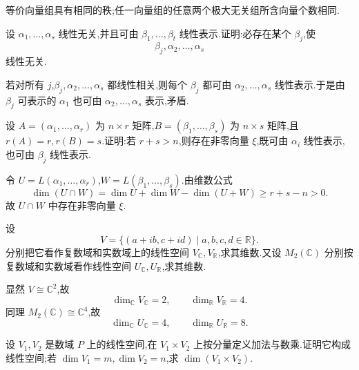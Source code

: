 \begin{corollary}[\markstar]
等价向量组具有相同的秩;任一向量组的任意两个极大无关组所含向量个数相同.
\end{corollary}

\begin{example}[\markstar]
设 $\alpha_1,\ldots,\alpha_s$ 线性无关,并且可由 $\beta_1,\ldots,\beta_t$ 线性表示.证明:必存在某个 $\beta_j$,使
\[
 \beta_j,\alpha_2,\ldots,\alpha_s
\]
线性无关.
\end{example}
\exampleblank

\begin{solution}
若对所有 $j$,$\beta_j,\alpha_2,\ldots,\alpha_s$ 都线性相关,则每个 $\beta_j$ 都可由 $\alpha_2,\ldots,\alpha_s$ 线性表示.于是由 $\beta_j$ 可表示的 $\alpha_1$ 也可由 $\alpha_2,\ldots,\alpha_s$ 表示,矛盾.
\end{solution}

\begin{example}
设 $A=(\alpha_1,\ldots,\alpha_r)$ 为 $n\times r$ 矩阵,$B=(\beta_1,\ldots,\beta_s)$ 为 $n\times s$ 矩阵,且 $r(A)=r,r(B)=s$.证明:若 $r+s>n$,则存在非零向量 $\xi$,既可由 $\alpha_i$ 线性表示,也可由 $\beta_j$ 线性表示.
\end{example}
\exampleblank

\begin{solution}
令 $U=L(\alpha_1,\ldots,\alpha_r)$,$W=L(\beta_1,\ldots,\beta_s)$.由维数公式
\[
 \dim(U\cap W)=\dim U+\dim W-\dim(U+W)
 \ge r+s-n>0.
\]
故 $U\cap W$ 中存在非零向量 $\xi$.
\end{solution}

\begin{example}
设
\[
V=\{(a+ib,c+id)\mid a,b,c,d\in\mathbb{R}\}.
\]
分别把它看作复数域和实数域上的线性空间 $V_{\mathbb{C}},V_{\mathbb{R}}$,求其维数.又设 $M_2(\mathbb{C})$ 分别按复数域和实数域看作线性空间 $U_{\mathbb{C}},U_{\mathbb{R}}$,求其维数.
\end{example}
\exampleblank

\begin{solution}
显然 $V\cong\mathbb{C}^2$,故
\[
 \dim_{\mathbb{C}}V_{\mathbb{C}}=2,
 \qquad
 \dim_{\mathbb{R}}V_{\mathbb{R}}=4.
\]
同理 $M_2(\mathbb{C})\cong\mathbb{C}^4$,故
\[
 \dim_{\mathbb{C}}U_{\mathbb{C}}=4,
 \qquad
 \dim_{\mathbb{R}}U_{\mathbb{R}}=8.
\]
\end{solution}

\begin{example}
设 $V_1,V_2$ 是数域 $P$ 上的线性空间,在 $V_1\times V_2$ 上按分量定义加法与数乘.证明它构成线性空间;若 $\dim V_1=m,\dim V_2=n$,求 $\dim(V_1\times V_2)$.
\end{example}
\exampleblank

